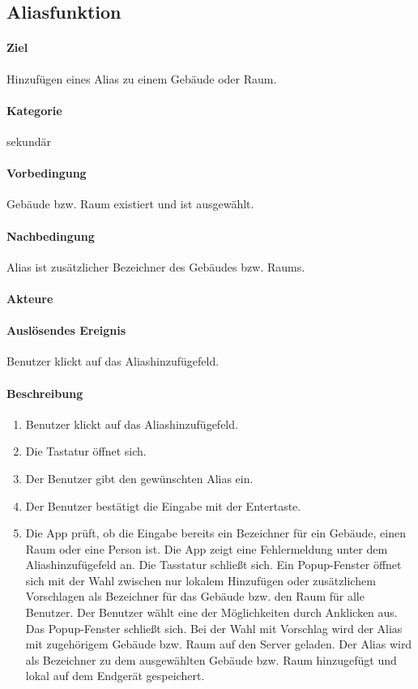 \subsection{Aliasfunktion}
\label{Aliasfunktion}
\paragraph{Ziel}
Hinzufügen eines Alias zu einem Gebäude oder Raum.
\paragraph{Kategorie}
sekundär
\paragraph{Vorbedingung}
Gebäude bzw. Raum existiert und ist ausgewählt.
\paragraph{Nachbedingung}
Alias ist zusätzlicher Bezeichner des Gebäudes bzw. Raums.
\paragraph{Akteure}

\paragraph{Auslösendes Ereignis}
Benutzer klickt auf das Aliashinzufügefeld.
\paragraph{Beschreibung}
\begin{enumerate}
    \item Benutzer klickt auf das Aliashinzufügefeld.
    \item Die Tastatur öffnet sich.
    \item Der Benutzer gibt den gewünschten Alias ein.
    \item Der Benutzer bestätigt die Eingabe mit der Entertaste.
    \item Die App prüft, ob die Eingabe bereits ein Bezeichner für ein Gebäude, einen Raum oder eine Person ist.
     Die App zeigt eine Fehlermeldung unter dem Aliashinzufügefeld an.
     Die Tasstatur schließt sich.
    \subitem Ein Popup-Fenster öffnet sich mit der Wahl zwischen nur lokalem Hinzufügen oder zusätzlichem Vorschlagen als Bezeichner für das Gebäude bzw. den Raum für alle Benutzer.
    \subitem Der Benutzer wählt eine der Möglichkeiten durch Anklicken aus. 
    \subitem Das Popup-Fenster schließt sich.
    \subitem Bei der Wahl mit Vorschlag wird der Alias mit zugehörigem Gebäude bzw. Raum auf den Server geladen.
    \subitem Der Alias wird als Bezeichner zu dem ausgewählten Gebäude bzw. Raum hinzugefügt und lokal auf dem Endgerät gespeichert.
\end{enumerate}